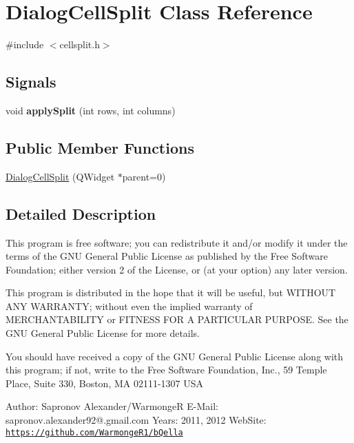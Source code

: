 \hypertarget{classDialogCellSplit}{
\section{DialogCellSplit Class Reference}
\label{classDialogCellSplit}
}


{\ttfamily \#include $<$cellsplit.h$>$}

\subsection*{Signals}
\begin{DoxyCompactItemize}
\item 
\hypertarget{classDialogCellSplit_aa90cd72c0261741a75009a00cca27411}{
void {\bfseries applySplit} (int rows, int columns)}
\label{classDialogCellSplit_aa90cd72c0261741a75009a00cca27411}

\end{DoxyCompactItemize}
\subsection*{Public Member Functions}
\begin{DoxyCompactItemize}
\item 
\hyperlink{classDialogCellSplit_a6a92aaa6ab8605c356d875e58cf780eb}{DialogCellSplit} (QWidget $\ast$parent=0)
\end{DoxyCompactItemize}


\subsection{Detailed Description}
This program is free software; you can redistribute it and/or modify it under the terms of the GNU General Public License as published by the Free Software Foundation; either version 2 of the License, or (at your option) any later version.

This program is distributed in the hope that it will be useful, but WITHOUT ANY WARRANTY; without even the implied warranty of MERCHANTABILITY or FITNESS FOR A PARTICULAR PURPOSE. See the GNU General Public License for more details.

You should have received a copy of the GNU General Public License along with this program; if not, write to the Free Software Foundation, Inc., 59 Temple Place, Suite 330, Boston, MA 02111-\/1307 USA

Author: Sapronov Alexander/WarmongeR E-\/Mail: sapronov.alexander92@.gmail.com Years: 2011, 2012 WebSite: \href{https://github.com/WarmongeR1/bQella}{\tt https://github.com/WarmongeR1/bQella} 


